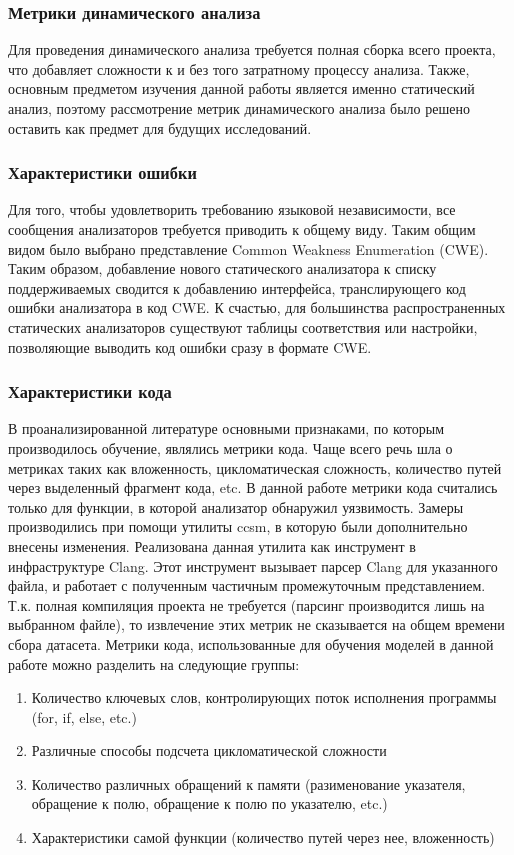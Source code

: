 \subsubsection{Метрики динамического анализа}
Для проведения динамического анализа требуется полная сборка всего проекта, что добавляет сложности к и без того затратному процессу анализа. Также, основным предметом изучения данной работы является именно статический анализ, поэтому рассмотрение метрик динамического анализа было решено оставить как предмет для будущих исследований.

\subsubsection{Характеристики ошибки}
\label{sec:Err-to-CWE} 
Для того, чтобы удовлетворить требованию языковой независимости, все сообщения анализаторов требуется приводить к общему виду. Таким общим видом было выбрано представление Common Weakness Enumeration (CWE)\cite{CWE-doc}. Таким образом, добавление нового статического анализатора к списку поддерживаемых сводится к добавлению интерфейса, транслирующего код ошибки анализатора в код CWE. К счастью, для большинства распространенных статических анализаторов существуют таблицы соответствия или настройки, позволяющие выводить код ошибки сразу в формате CWE.

\subsubsection{Характеристики кода}
В проанализированной литературе основными признаками, по которым производилось обучение, являлись метрики кода. Чаще всего речь шла о метриках таких как вложенность, цикломатическая сложность, количество путей через выделенный фрагмент кода, etc. В данной работе метрики кода считались только для функции, в которой анализатор обнаружил уязвимость. Замеры производились при помощи утилиты ccsm\cite{CCSM}, в которую были дополнительно внесены изменения. Реализована данная утилита как инструмент в инфраструктуре Clang\cite{Clang}. Этот инструмент вызывает парсер Clang для указанного файла, и работает с полученным частичным промежуточным представлением. Т.к. полная компиляция проекта не требуется (парсинг производится лишь на выбранном файле), то извлечение этих метрик не сказывается на общем времени сбора датасета. Метрики кода, использованные для обучения моделей в данной работе можно разделить на следующие группы:

\begin{enumerate}
    \item Количество ключевых слов, контролирующих поток исполнения программы (for, if, else, etc.)
    \item Различные способы подсчета цикломатической сложности
    \item Количество различных обращений к памяти (разименование указателя, обращение к полю, обращение к полю по указателю, etc.)
    \item Характеристики самой функции (количество путей через нее, вложенность)
\end{enumerate}

